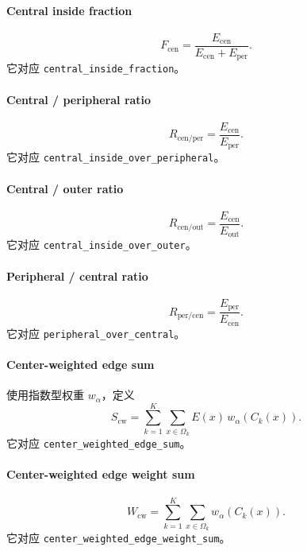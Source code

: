 \documentclass[11pt]{article}
\newcommand{\1}{\mathbf{1}}
\newcommand{\edgefield}{E}
\begin{document}
\paragraph{Central inside fraction}
\begin{equation}
F_{\mathrm{cen}} = \frac{E_{\mathrm{cen}}}{E_{\mathrm{cen}}+E_{\mathrm{per}}}.
\end{equation}
它对应 \texttt{central\_inside\_fraction}。

\paragraph{Central / peripheral ratio}
\begin{equation}
R_{\mathrm{cen/per}} = \frac{E_{\mathrm{cen}}}{E_{\mathrm{per}}}.
\end{equation}
它对应 \texttt{central\_inside\_over\_peripheral}。

\paragraph{Central / outer ratio}
\begin{equation}
R_{\mathrm{cen/out}} = \frac{E_{\mathrm{cen}}}{E_{\mathrm{out}}}.
\end{equation}
它对应 \texttt{central\_inside\_over\_outer}。

\paragraph{Peripheral / central ratio}
\begin{equation}
R_{\mathrm{per/cen}} = \frac{E_{\mathrm{per}}}{E_{\mathrm{cen}}}.
\end{equation}
它对应 \texttt{peripheral\_over\_central}。

\paragraph{Center-weighted edge sum}
使用指数型权重 $w_{\alpha}$，定义
\begin{equation}
S_{\mathrm{cw}} = \sum_{k=1}^{K}\sum_{x\in\Omega_k} \edgefield(x)\,w_{\alpha}(C_k(x)).
\end{equation}
它对应 \texttt{center\_weighted\_edge\_sum}。

\paragraph{Center-weighted edge weight sum}
\begin{equation}
W_{\mathrm{cw}} = \sum_{k=1}^{K}\sum_{x\in\Omega_k} w_{\alpha}(C_k(x)).
\end{equation}
它对应 \texttt{center\_weighted\_edge\_weight\_sum}。
\end{document}
